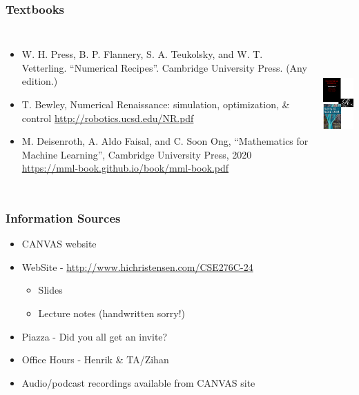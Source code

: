 \documentclass[10pt]{beamer}
\begin{document}
\begin{frame}
  \frametitle{Textbooks}
  \begin{columns}
    \column{7cm}
    \begin{itemize}
      \item W. H. Press, B. P. Flannery, S. A. Teukolsky, and W. T. Vetterling.
            ``Numerical Recipes''. Cambridge University Press. (Any edition.)
      \item T. Bewley, Numerical Renaissance: simulation, optimization, \&
            control
            \url{http://robotics.ucsd.edu/NR.pdf}
      \item M. Deisenroth, A. Aldo Faisal, and C. Soon Ong, ``Mathematics for
            Machine Learning'', Cambridge University Press, 2020
            \url{https://mml-book.github.io/book/mml-book.pdf}
    \end{itemize}
    \column{3cm}
    \begin{center}
      \includegraphics[height=5cm]{books}
    \end{center}
  \end{columns}
\end{frame}

\begin{frame}
  \frametitle{Information Sources}
  \begin{itemize}
  \item CANVAS website
  \item WebSite - \url{http://www.hichristensen.com/CSE276C-24}
    \begin{itemize}
    \item Slides
    \item Lecture notes (handwritten sorry!)
    \end{itemize}
  \item Piazza - Did you all get an invite?
  \item Office Hours - Henrik \& TA/Zihan
  \item Audio/podcast recordings available from CANVAS site
  \end{itemize}
\end{frame}
\end{document}
